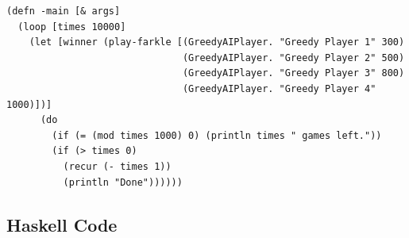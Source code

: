 \documentclass{article}
\begin{document}
\begin{lstlisting}
(defn -main [& args]
  (loop [times 10000]
    (let [winner (play-farkle [(GreedyAIPlayer. "Greedy Player 1" 300)
                               (GreedyAIPlayer. "Greedy Player 2" 500)
                               (GreedyAIPlayer. "Greedy Player 3" 800)
                               (GreedyAIPlayer. "Greedy Player 4" 1000)])]
      (do
        (if (= (mod times 1000) 0) (println times " games left."))
        (if (> times 0)
          (recur (- times 1))
          (println "Done"))))))
\end{lstlisting}

\subsection{Haskell Code}

\lstset{language=Haskell,numbers=left,showspaces=false,showstringspaces=false,basicstyle=\footnotesize,numberstyle=\footnotesize}
\end{document}
